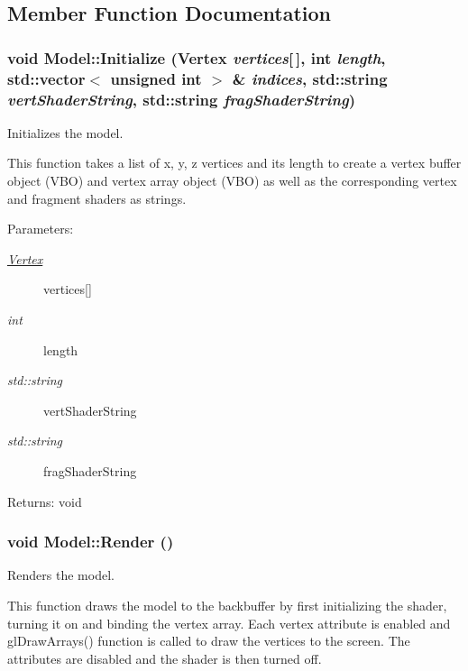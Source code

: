 \subsection{Member Function Documentation}
\hypertarget{class_model_bb9bbb4050349e0c775dd383474aca37}{
\subsubsection[Initialize]{\setlength{\rightskip}{0pt plus 5cm}void Model::Initialize ({\bf Vertex} {\em vertices}\mbox{[}$\,$\mbox{]}, \/  int {\em length}, \/  std::vector$<$ unsigned int $>$ \& {\em indices}, \/  std::string {\em vertShaderString}, \/  std::string {\em fragShaderString})}}
\label{class_model_bb9bbb4050349e0c775dd383474aca37}


Initializes the model. 

This function takes a list of x, y, z vertices and its length to create a vertex buffer object (VBO) and vertex array object (VBO) as well as the corresponding vertex and fragment shaders as strings.

\begin{Desc}
\item[Parameters:]
\begin{description}
\item[{\em \hyperlink{struct_vertex}{Vertex}}]vertices\mbox{[}\mbox{]} \item[{\em int}]length \item[{\em std::string}]vertShaderString \item[{\em std::string}]fragShaderString \end{description}
\end{Desc}
\begin{Desc}
\item[Returns:]void \end{Desc}
\hypertarget{class_model_0a3de8a969bada5a82ffa727f8c216b5}{
\subsubsection[Render]{\setlength{\rightskip}{0pt plus 5cm}void Model::Render ()}}
\label{class_model_0a3de8a969bada5a82ffa727f8c216b5}


Renders the model. 

This function draws the model to the backbuffer by first initializing the shader, turning it on and binding the vertex array. Each vertex attribute is enabled and glDrawArrays() function is called to draw the vertices to the screen. The attributes are disabled and the shader is then turned off.

